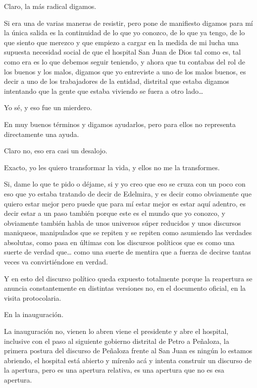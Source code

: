Claro, la más radical digamos.

Si era una de varias maneras de resistir, pero pone de manifiesto digamos para mí la única salida es la continuidad de lo que yo conozco, de lo que ya tengo, de lo que siento que merezco y que empiezo a cargar en la medida de mi lucha una supuesta necesidad social de que el hospital San Juan de Dios tal como es, tal como era es lo que debemos seguir teniendo, y ahora que tu contabas del rol de los buenos y los malos, digamos que yo entreviste a uno de los malos buenos, es decir a uno de los trabajadores de la entidad, distrital que estaba digamos intentando que la gente que estaba viviendo se fuera a otro lado…

Yo sé, y eso fue un mierdero.

En muy buenos términos y digamos ayudarlos, pero para ellos no representa directamente una ayuda.

Claro no, eso era casi un desalojo.

Exacto, yo les quiero transformar la vida, y ellos no me la transformes.

Si, dame lo que te pido o déjame, si y yo creo que eso se cruza con un poco con eso que yo estaba tratando de decir de Edelmira, y es decir como obviamente que quiero estar mejor pero puede que para mí estar mejor es estar aquí adentro, es decir estar a un paso también porque  este es el mundo que yo conozco, y obviamente también habla de unos universos súper reducidos y unos discursos maniqueos, manipulados que se repiten y se repiten como asumiendo las verdades absolutas, como pasa en últimas con los discursos políticos que es como una suerte de verdad que… como una suerte de mentira que a fuerza de decirse tantas veces va convirtiéndose en verdad.

Y en esto del discurso político queda expuesto totalmente porque la reapertura se anuncia constantemente en distintas versiones no, en el documento oficial, en la visita protocolaria.

En la inauguración.

La inauguración no, vienen lo abren viene el presidente y abre el hospital, inclusive con el paso al siguiente gobierno distrital de Petro a Peñaloza, la primera postura del discurso de Peñaloza frente al San Juan es ningún lo estamos abriendo, el hospital está abierto y mírenlo acá y intenta construir un discurso de la apertura, pero es una apertura relativa, es una apertura que no es esa apertura.

